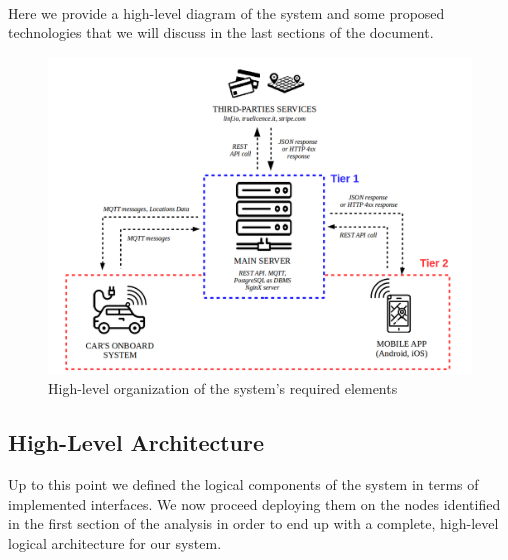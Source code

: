 \documentclass[11pt]{article} %
\begin{document}
\hfill\

Here we provide a high-level diagram of the system and some proposed technologies that we will discuss in the last sections of  the document.


\begin{figure}[H]
	\centering
	\includegraphics[width=1\textwidth]{proposed_system.png}
	\caption{High-level organization of the system's required elements}
\end{figure}




\subsection{High-Level Architecture}

Up to this point we defined the logical components of the system in terms of implemented interfaces. We now proceed deploying them on the nodes identified in the first section of the analysis in order to end up with a complete, high-level logical architecture for our system.
\end{document}
